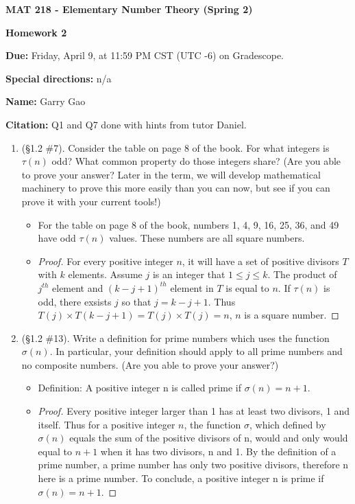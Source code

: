 \documentclass[11pt,a4paper]{article}
\begin{document}
\begin{Large}
\centerline{\bf MAT 218 - Elementary Number Theory (Spring 2)}\medskip
\centerline{\bf Homework 2}\medskip
\end{Large}
{\bf Due:} Friday, April 9, at 11:59 PM CST (UTC -6) on Gradescope.

{\bf Special directions:} n/a

{\bf Name:} Garry Gao

{\bf Citation:} Q1 and Q7 done with hints from tutor Daniel.


\hrulefill

\begin{enumerate}
	\item (\S 1.2 \#7). Consider the table on page 8 of the book.  For what integers is \(\tau\!\left(n\right)\) odd?  What common property do those integers share? (Are you able to prove your answer? Later in the term, we will develop mathematical machinery to prove this more easily than you can now, but see if you can prove it with your current tools!)

	\begin{itemize}
  \item For the table on page 8  of the book, numbers 1, 4, 9, 16, 25, 36, and 49 have odd \(\tau\!\left(n\right)\) values. These numbers are all square numbers.
	\item \begin{proof} For every positive integer $n$, it will have a set of positive divisors $T$ with $k$ elements. Assume $j$ is an integer that $1\leq j \leq k$. The product of $j^{th}$ element and $(k-j+1)^{th}$ element in $T$ is equal to $n$. If $\tau(n)$ is odd, there exsists $j$ so that $j=k-j+1$. Thus $T(j) \times T(k-j+1) = T(j) \times T(j) = n$, $n$ is a square number. \end{proof}
	\end{itemize}


	\item (\S 1.2 \#13). Write a definition for prime numbers which uses the function \(\sigma\!\left(n\right)\).  In particular, your definition should apply to all prime numbers and no composite numbers. (Are you able to prove your answer?)

	\begin{itemize}
		\item Definition: A positive integer n is called prime if \(\sigma\!\left(n\right) = n + 1\).
		\item \begin{proof} Every positive integer larger than 1 has at least two divisors, 1 and itself. Thus for a positive integer $n$, the function \(\sigma\), which defined by \(\sigma\!\left(n\right)\) equals the sum of the positive divisors of n, would and only would equal to \(n+1\) when it has two divisors, n and 1. By the definition of a prime number, a prime number has only two positive divisors, therefore n here is a prime number. To conclude, a positive integer n is prime if \(\sigma\!\left(n\right) = n + 1\). \end{proof}
	\end{itemize}



\end{enumerate}
\end{document}
